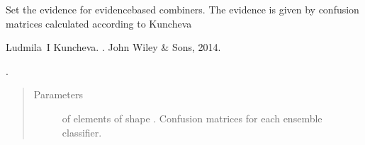 \documentclass[letterpaper,10pt,english]{sphinxmanual}
\begin{document}
\begin{fulllineitems}
\begin{fulllineitems}
\begin{quote}
\begin{description}
\end{description}\end{quote}

\end{fulllineitems}


\begin{fulllineitems}
\label{\detokenize{pusion.control.decision_processor:pusion.control.decision_processor.DecisionProcessor.set_evidence}}
\sphinxAtStartPar
Set the evidence for evidence\sphinxhyphen{}based combiners. The evidence is given by confusion matrices calculated
according to Kuncheva %
\begin{footnote}[1]\sphinxAtStartFootnote
Ludmila I Kuncheva. . John Wiley \& Sons, 2014.
%
\end{footnote}.

\sphinxAtStartPar

\begin{quote}\begin{description}
\item[{Parameters}] \leavevmode
\sphinxAtStartPar
{} \textendash{}  of  elements of shape . Confusion matrices
for each ensemble classifier.

\end{description}\end{quote}

\end{fulllineitems}



\end{fulllineitems}
\end{document}
